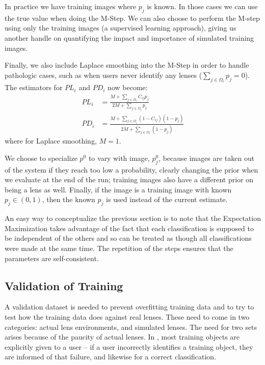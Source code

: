 \documentclass[useAMS,usenatbib,a4paper]{mn2e}
\begin{document}
In practice we have training images where $p_{j}$ is known. In those
cases we can use the true value when doing the M-Step. We can also choose to
perform the M-step using only the training images (a supervised learning
approach), giving us another handle on quantifying the impact and importance of
simulated training images.

Finally, we also include Laplace smoothing into the M-Step in order to handle
pathologic cases, such as when users never identify any lenses ($\sum_{j \in
\Omega_{i}} p_j = 0$). The estimators for $PL_{i}$ and $PD_{i}$ now become:
\begin{align}
  PL_{i} &= \frac{M + \sum_{j \in \Omega_i} C_{ij} p_{j}}{2M + \sum_{j \in
\Omega_i} p_{j}} \\
  PD_{i} &= \frac{M + \sum_{j \in \Omega_i} (1 - C_{ij}) (1 - p_{j})}{2M + \sum_{j \in
\Omega_i} (1 - p_{j})}
\end{align}
where for Laplace smoothing, $M = 1$.

We choose to specialize $p^{0}$ to vary with
image, $p_{j}^{0}$, because images are taken out of the \sw system if they reach
too low a probability, clearly changing the prior when we evaluate at the end
of the run; training images also have a
different prior on being a lens as well. Finally, if the image is a training
image with known $p_j \in (0,1)$, then the known $p_j$ is used instead of
the current estimate.

An easy way to conceptualize the previous section is to note that the
Expectation Maximization takes advantage of the fact that each classification
is supposed to be independent of the others and so can be treated as though all
classifications were made at the same time.  The repetition of the steps
ensures that the parameters are self-consistent.


\subsection{Validation of Training}
\label{sec:validation}


A validation dataset is needed to prevent overfitting training data and to try
to test how the training data does against real lenses. These need to come in
two categories: actual lens environments, and simulated lenses. The need for
two sets arises because of the paucity of actual lenses. In \SW, most training
objects are explicitly given to a user -- if a user incorrectly identifies a
training object, they are informed of that failure, and likewise for a correct
classification.
\end{document}
